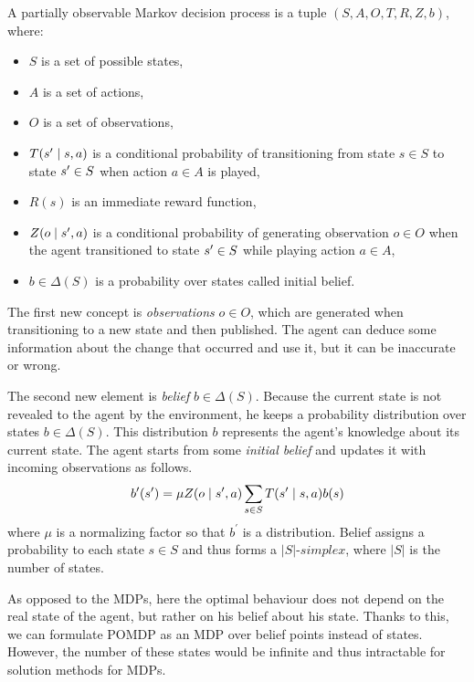 \documentclass[../main.tex]{subfiles}
\begin{document}
\begin{definition}\label{bg:pomdp:def}
    A partially observable Markov decision process is a tuple $\left(S, A, O, T, R, Z, b\right)$, where:
    \begin{itemize}
        \item $S$ is a set of possible states,
        \item $A$ is a set of actions,
        \item $O$ is a set of observations,
        \item $T(s^{\prime} \mid s, a)$ is a conditional probability of transitioning from state $s \in S$ to state $s^{\prime} \in S$ when action $a \in A$ is played,
        \item $R(s)$ is an immediate reward function,
        \item $Z(o \mid s^{\prime}, a)$ is a conditional probability of generating observation $o \in O$ when the agent transitioned to state $s^{\prime} \in S$ while playing action $a \in A$,
        \item $b \in \Delta(S)$ is a probability over states called initial belief.
    \end{itemize}
\end{definition}

The first new concept is \textit{observations} $o \in O$, which are generated when transitioning to a new state and then published.
The agent can deduce some information about the change that occurred and use it, but it can be inaccurate or wrong.

The second new element is \textit{belief} $b \in \Delta(S)$.
Because the current state is not revealed to the agent by the environment, he keeps a probability distribution over states $b \in \Delta(S)$.
This distribution $b$ represents the agent's knowledge about its current state.
The agent starts from some \textit{initial belief} and updates it with incoming observations as follows.
\begin{equation}\label{bg:pomdp:beliefupdate}
    b^{\prime}(s^{\prime}) = \mu Z(o \mid s^{\prime}, a)\sum_{s \in S}T(s^{\prime} \mid s, a)b(s)
\end{equation}
where $\mu$ is a normalizing factor so that $b^{\prime}$ is a distribution.
Belief assigns a probability to each state $s \in S$ and thus forms a $|S|$-$simplex$, where $|S|$ is the number of states.

As opposed to the MDPs, here the optimal behaviour does not depend on the real state of the agent, but rather on his belief about his state.
Thanks to this, we can formulate POMDP as an MDP over belief points instead of states.
However, the number of these states would be infinite and thus intractable for solution methods for MDPs.
\end{document}
